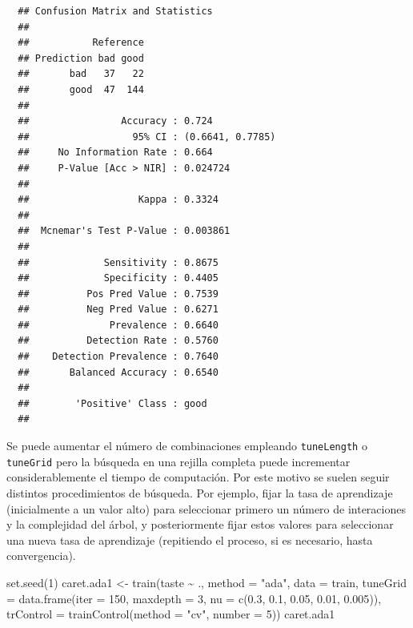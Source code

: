 \documentclass[
]{book}
\newenvironment{Shaded}{\begin{snugshade}}{\end{snugshade}}
\newcommand{\AttributeTok}[1]{\textcolor[rgb]{0.77,0.63,0.00}{#1}}
\newcommand{\DecValTok}[1]{\textcolor[rgb]{0.00,0.00,0.81}{#1}}
\newcommand{\FloatTok}[1]{\textcolor[rgb]{0.00,0.00,0.81}{#1}}
\newcommand{\FunctionTok}[1]{\textcolor[rgb]{0.00,0.00,0.00}{#1}}
\newcommand{\NormalTok}[1]{#1}
\newcommand{\OtherTok}[1]{\textcolor[rgb]{0.56,0.35,0.01}{#1}}
\newcommand{\SpecialCharTok}[1]{\textcolor[rgb]{0.00,0.00,0.00}{#1}}
\newcommand{\StringTok}[1]{\textcolor[rgb]{0.31,0.60,0.02}{#1}}
\theoremstyle{break}
\theoremstyle{nonumberplain}
\begin{document}
\begin{verbatim}
  ## Confusion Matrix and Statistics
  ## 
  ##           Reference
  ## Prediction bad good
  ##       bad   37   22
  ##       good  47  144
  ##                                           
  ##                Accuracy : 0.724           
  ##                  95% CI : (0.6641, 0.7785)
  ##     No Information Rate : 0.664           
  ##     P-Value [Acc > NIR] : 0.024724        
  ##                                           
  ##                   Kappa : 0.3324          
  ##                                           
  ##  Mcnemar's Test P-Value : 0.003861        
  ##                                           
  ##             Sensitivity : 0.8675          
  ##             Specificity : 0.4405          
  ##          Pos Pred Value : 0.7539          
  ##          Neg Pred Value : 0.6271          
  ##              Prevalence : 0.6640          
  ##          Detection Rate : 0.5760          
  ##    Detection Prevalence : 0.7640          
  ##       Balanced Accuracy : 0.6540          
  ##                                           
  ##        'Positive' Class : good            
  ## 
\end{verbatim}

Se puede aumentar el número de combinaciones empleando \texttt{tuneLength} o \texttt{tuneGrid} pero la búsqueda en una rejilla completa puede incrementar considerablemente el tiempo de computación.
Por este motivo se suelen seguir distintos procedimientos de búsqueda. Por ejemplo, fijar la tasa de aprendizaje (inicialmente a un valor alto) para seleccionar primero un número de interaciones y la complejidad del árbol, y posteriormente fijar estos valores para seleccionar una nueva tasa de aprendizaje (repitiendo el proceso, si es necesario, hasta convergencia).

\begin{Shaded}
\begin{Highlighting}[]
\FunctionTok{set.seed}\NormalTok{(}\DecValTok{1}\NormalTok{)}
\NormalTok{caret.ada1 }\OtherTok{\textless{}{-}} \FunctionTok{train}\NormalTok{(taste }\SpecialCharTok{\textasciitilde{}}\NormalTok{ ., }\AttributeTok{method =} \StringTok{"ada"}\NormalTok{, }\AttributeTok{data =}\NormalTok{ train,}
                    \AttributeTok{tuneGrid =} \FunctionTok{data.frame}\NormalTok{(}\AttributeTok{iter =}  \DecValTok{150}\NormalTok{, }\AttributeTok{maxdepth =} \DecValTok{3}\NormalTok{,}
                                 \AttributeTok{nu =} \FunctionTok{c}\NormalTok{(}\FloatTok{0.3}\NormalTok{, }\FloatTok{0.1}\NormalTok{, }\FloatTok{0.05}\NormalTok{, }\FloatTok{0.01}\NormalTok{, }\FloatTok{0.005}\NormalTok{)),}
                   \AttributeTok{trControl =} \FunctionTok{trainControl}\NormalTok{(}\AttributeTok{method =} \StringTok{"cv"}\NormalTok{, }\AttributeTok{number =} \DecValTok{5}\NormalTok{))}
\NormalTok{caret.ada1}
\end{Highlighting}
\end{Shaded}
\end{document}
